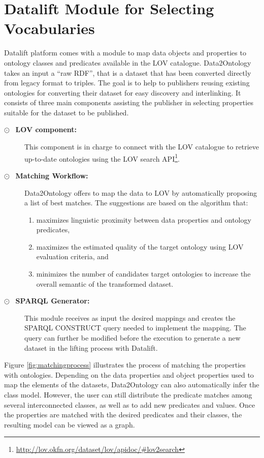 \section{Datalift Module for Selecting Vocabularies}
\label{sec:data2rdf}
Datalift platform comes with a module to map data objects and properties to ontology classes and predicates available in the LOV catalogue. Data2Ontology takes an input a ``raw RDF'', that is a dataset that has been converted directly from legacy format to triples. The goal is to help to publishers reusing existing ontologies for converting their dataset for easy discovery and interlinking. It consists of three main components assisting the publisher in selecting properties suitable for the dataset to be published. \begin{description}
\item[$\odot$~ \textbf{LOV component:}] This component is in charge to connect with the LOV catalogue to retrieve up-to-date ontologies using the LOV search API\footnote{\url{http://lov.okfn.org/dataset/lov/apidoc/\#lov2search}}.
\item[$\odot$~ \textbf{Matching Workflow:}] Data2Ontology offers to map the data to LOV by automatically proposing a list of best matches. The suggestions are based on the algorithm that:
   \begin{enumerate}
   \item maximizes linguistic proximity between data properties and ontology predicates,
   \item maximizes the estimated quality of the target ontology using LOV evaluation criteria, and
   \item minimizes the number of candidates target ontologies to increase the overall semantic of the transformed dataset.
   \end{enumerate}

 \item[$\odot$~ \textbf{SPARQL Generator:}] This module receives as input the desired mappings and creates the SPARQL CONSTRUCT query needed to implement the mapping. The query can further be modified before the execution to generate a new dataset in the lifting process with Datalift.

\end{description}
Figure \ref{fig:matchingprocess} illustrates the process of matching the properties with ontologies. Depending on the data properties and object properties used to map the elements of the datasets, Data2Ontology can also automatically infer the class model. However, the user can still distribute the predicate matches among several interconnected classes, as well as to add new predicates and values. Once the properties are matched with the desired predicates and their classes, the resulting model can be viewed as a graph.

